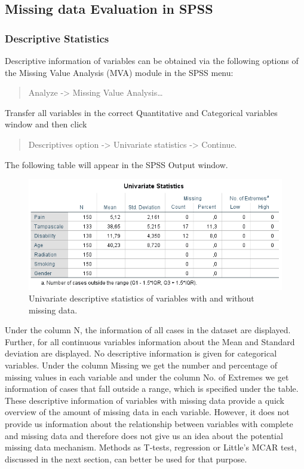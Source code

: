 \documentclass[]{book}
\begin{document}
\subsection{Missing data Evaluation in
SPSS}\label{missing-data-evaluation-in-spss}

\subsubsection{Descriptive Statistics}\label{descriptive-statistics}

Descriptive information of variables can be obtained via the following
options of the Missing Value Analysis (MVA) module in the SPSS menu:

\begin{quote}
Analyze -\textgreater{} Missing Value Analysis\ldots{}
\end{quote}

Transfer all variables in the correct Quantitative and Categorical
variables window and then click

\begin{quote}
Descriptives option -\textgreater{} Univariate statistics
-\textgreater{} Continue.
\end{quote}

The following table will appear in the SPSS Output window.

\begin{figure}

{\centering \includegraphics[width=0.9\linewidth]{images/tab2.4} 

}

\caption{Univariate descriptive statistics of variables with and without missing data.}\label{fig:tab2-4}
\end{figure}

Under the column N, the information of all cases in the dataset are
displayed. Further, for all continuous variables information about the
Mean and Standard deviation are displayed. No descriptive information is
given for categorical variables. Under the column Missing we get the
number and percentage of missing values in each variable and under the
column No. of Extremes we get information of cases that fall outside a
range, which is specified under the table. These descriptive information
of variables with missing data provide a quick overview of the amount of
missing data in each variable. However, it does not provide us
information about the relationship between variables with complete and
missing data and therefore does not give us an idea about the potential
missing data mechanism. Methods as T-tests, regression or Little's MCAR
test, discussed in the next section, can better be used for that
purpose.
\end{document}
